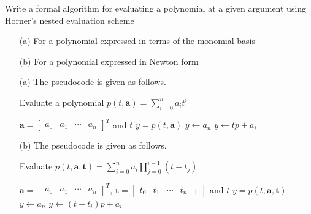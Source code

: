 \begin{pro}
  Write a formal algorithm for evaluating a polynomial
  at a given argument using Horner's nested evaluation scheme
  \begin{itemize}
  \item[(a)]
    For a polynomial expressed in terms of the monomial basis

  \item[(b)]
    For a polynomial expressed in Newton form
  \end{itemize}
\end{pro}
\begin{sol}
  \begin{itemize}

    \item[(a)]
  The pseudocode is given as follows.
  \begin{algorithm}[htb]
  \caption{Evaluate a polynomial $p(t, \mathbf{a})= \sum_{i=0}^na_it^i$}
  \begin{algorithmic}[1]
    \renewcommand{\algorithmicrequire}{\textbf{Input : }}
    \REQUIRE $\mathbf{a} =
    \begin{bmatrix}
      a_0 & a_1 & \cdots & a_n
    \end{bmatrix}^T
$ and $t$
   \renewcommand{\algorithmicrequire}{\textbf{Precondition : }}
    \renewcommand{\algorithmicensure}{\textbf{Output : }}
    \ENSURE $y = p(t, \mathbf{a})$
    \STATE
    $y\leftarrow a_n$
    \STATE $y \leftarrow tp + a_i$
    \ENDFOR
  \end{algorithmic}
\end{algorithm}

\item[(b)]
  The pseudocode is given as follows.
  \begin{algorithm}[htb]
    \caption{Evaluate $p(t, \mathbf{a}, \mathbf{t}) = \sum_{i=0}^na_i\prod_{j=0}^{i-1}(t-t_j)$}
  \begin{algorithmic}[1]
    \renewcommand{\algorithmicrequire}{\textbf{Input : }}
    \REQUIRE $\mathbf{a} =
    \begin{bmatrix}
      a_0 & a_1 & \cdots & a_n
    \end{bmatrix}^T
    $, $\mathbf{t} =
    \begin{bmatrix}
      t_0 & t_1 & \cdots & t_{n-1}
    \end{bmatrix}
    $ and $t$
   \renewcommand{\algorithmicrequire}{\textbf{Precondition : }}
    \renewcommand{\algorithmicensure}{\textbf{Output : }}
    \ENSURE $y = p(t, \mathbf{a}, \mathbf{t})$
    \STATE
    $y\leftarrow a_n$
    \STATE $y \leftarrow (t-t_i)p + a_i$
    \ENDFOR
  \end{algorithmic}
\end{algorithm}  
\end{itemize}
\end{sol}
